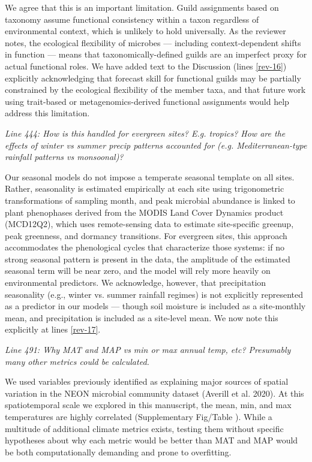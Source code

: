 \documentclass[11pt]{article}
\begin{document}
We agree that this is an important limitation. Guild assignments based on taxonomy assume functional consistency within a taxon regardless of environmental context, which is unlikely to hold universally. As the reviewer notes, the ecological flexibility of microbes --- including context-dependent shifts in function --- means that taxonomically-defined guilds are an imperfect proxy for actual functional roles. We have added text to the Discussion (lines \ref{rev-16}) explicitly acknowledging that forecast skill for functional guilds may be partially constrained by the ecological flexibility of the member taxa, and that future work using trait-based or metagenomics-derived functional assignments would help address this limitation.

\bigskip

\textit{Line 444: How is this handled for evergreen sites? E.g. tropics? How are the effects of winter vs summer precip patterns accounted for (e.g. Mediterranean-type rainfall patterns vs monsoonal)?}

Our seasonal models do not impose a temperate seasonal template on all sites. Rather, seasonality is estimated empirically at each site using trigonometric transformations of sampling month, and peak microbial abundance is linked to plant phenophases derived from the MODIS Land Cover Dynamics product (MCD12Q2), which uses remote-sensing data to estimate site-specific greenup, peak greenness, and dormancy transitions. For evergreen sites, this approach accommodates the phenological cycles that characterize those systems: if no strong seasonal pattern is present in the data, the amplitude of the estimated seasonal term will be near zero, and the model will rely more heavily on environmental predictors. We acknowledge, however, that precipitation seasonality (e.g., winter vs. summer rainfall regimes) is not explicitly represented as a predictor in our models --- though soil moisture is included as a site-monthly mean, and precipitation is included as a site-level mean. We now note this explicitly at lines \ref{rev-17}.

\bigskip

\textit{Line 491: Why MAT and MAP vs min or max annual temp, etc? Presumably many other metrics could be calculated.}

We used variables previously identified as explaining major sources of spatial variation in the NEON microbial community dataset (Averill et al. 2020). At this spatiotemporal scale we explored in this manuscript, the mean, min, and max temperatures are highly correlated (Supplementary Fig/Table %
). While a multitude of additional climate metrics exists, testing them without specific hypotheses about why each metric would be better than MAT and MAP would be both computationally demanding and prone to overfitting.
\end{document}
